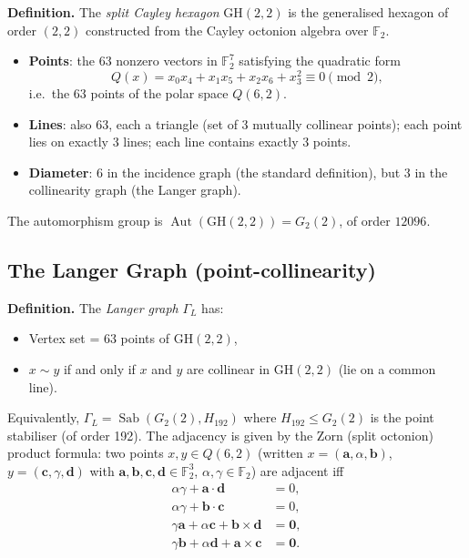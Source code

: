 \documentclass[11pt,a4paper]{article}
\theoremstyle{plain}
\theoremstyle{definition}
\newcommand{\Sab}{\operatorname{Sab}}
\newcommand{\Aut}{\operatorname{Aut}}
\newcommand{\GH}{\mathrm{GH}}
\begin{document}
\begin{tcolorbox}[breakable, colback=green!8, colframe=green!8,
  boxrule=0pt, sharp corners]
\textbf{Definition.} The \emph{split Cayley hexagon} $\GH(2,2)$ is the
generalised hexagon of order $(2,2)$ constructed from the Cayley octonion
algebra over $\mathbb{F}_2$.

\begin{itemize}
\item \textbf{Points}: the 63 nonzero vectors in $\mathbb{F}_2^7$
  satisfying the quadratic form
  \[
    Q(x) = x_0 x_4 + x_1 x_5 + x_2 x_6 + x_3^2 \equiv 0 \pmod{2},
  \]
  i.e.\ the 63 points of the polar space $Q(6,2)$.
\item \textbf{Lines}: also 63, each a triangle (set of 3 mutually collinear
  points); each point lies on exactly 3 lines; each line contains exactly
  3 points.
\item \textbf{Diameter}: 6 in the incidence graph (the standard definition),
  but 3 in the collinearity graph (the Langer graph).
\end{itemize}

The automorphism group is $\Aut(\GH(2,2)) = G_2(2)$, of order $12096$.
\end{tcolorbox}

\subsection{The Langer Graph (point-collinearity)}

\begin{tcolorbox}[breakable, colback=green!8, colframe=green!8,
  boxrule=0pt, sharp corners]
\textbf{Definition.} The \emph{Langer graph} $\Gamma_L$ has:
\begin{itemize}
\item Vertex set = 63 points of $\GH(2,2)$,
\item $x \sim y$ if and only if $x$ and $y$ are collinear in $\GH(2,2)$
  (lie on a common line).
\end{itemize}
Equivalently, $\Gamma_L = \Sab(G_2(2), H_{192})$ where $H_{192} \leq G_2(2)$
is the point stabiliser (of order 192).
The adjacency is given by the Zorn (split octonion) product formula:
two points $x, y \in Q(6,2)$ (written $x = (\mathbf{a}, \alpha, \mathbf{b})$,
$y = (\mathbf{c}, \gamma, \mathbf{d})$ with $\mathbf{a},\mathbf{b},\mathbf{c},
\mathbf{d} \in \mathbb{F}_2^3$, $\alpha, \gamma \in \mathbb{F}_2$) are adjacent iff
\begin{align*}
\alpha\gamma + \mathbf{a}\cdot\mathbf{d} &= 0, \\
\alpha\gamma + \mathbf{b}\cdot\mathbf{c} &= 0, \\
\gamma\mathbf{a} + \alpha\mathbf{c} + \mathbf{b}\times\mathbf{d} &= \mathbf{0}, \\
\gamma\mathbf{b} + \alpha\mathbf{d} + \mathbf{a}\times\mathbf{c} &= \mathbf{0}.
\end{align*}
\end{tcolorbox}
\end{document}
